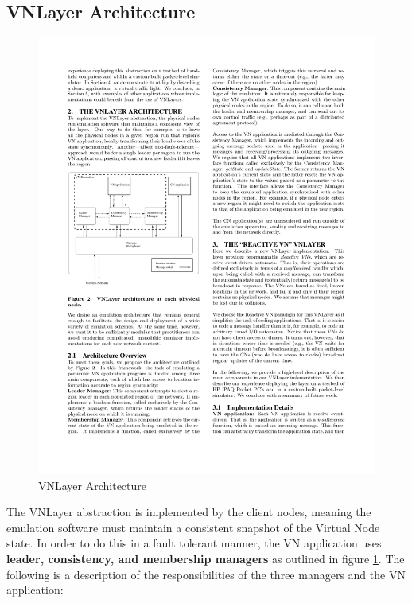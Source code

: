 \documentclass[12pt]{article}
\begin{document}
\subsection{VNLayer Architecture}
\begin{figure}
\begin{center}
\includegraphics[width=.65\textwidth]{vnlayerarchitecture.pdf} 
\caption{VNLayer Architecture \cite{vnlayer}}
\label{fig:vnlayerArch}
\end{center}
\end{figure}
The VNLayer abstraction is implemented by the client nodes, meaning the emulation software must maintain a consistent snapshot of the Virtual Node state.  %
 In order to do this in a fault tolerant manner, the VN application uses  {\bf leader, consistency, and membership managers} as outlined in figure \ref{fig:vnlayerArch}.  The following is a description of the responsibilities of the three managers and the VN application:
\end{document}
